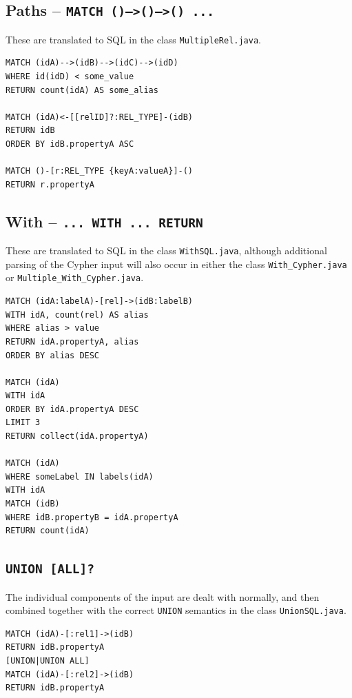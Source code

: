 \documentclass[letterpaper]{ltxdoc}
\begin{document}
\subsection*{Paths -- \texttt{MATCH ()-->()-->() ...}}
These are translated to SQL in the class \texttt{MultipleRel.java}.

\medskip

\begin{lstlisting}[language = Cypher]
MATCH (idA)-->(idB)-->(idC)-->(idD)
WHERE id(idD) < some_value
RETURN count(idA) AS some_alias

MATCH (idA)<-[[relID]?:REL_TYPE]-(idB)
RETURN idB
ORDER BY idB.propertyA ASC

MATCH ()-[r:REL_TYPE {keyA:valueA}]-()
RETURN r.propertyA
\end{lstlisting}

\subsection*{With -- \texttt{... WITH ... RETURN}}
These are translated to SQL in the class \texttt{WithSQL.java}, although additional parsing of the Cypher input will also occur in either the class \texttt{With\_Cypher.java} or \texttt{Multiple\_With\_Cypher.java}.

\medskip

\begin{lstlisting}[language = Cypher]
MATCH (idA:labelA)-[rel]->(idB:labelB)
WITH idA, count(rel) AS alias
WHERE alias > value
RETURN idA.propertyA, alias
ORDER BY alias DESC

MATCH (idA)
WITH idA
ORDER BY idA.propertyA DESC
LIMIT 3
RETURN collect(idA.propertyA)

MATCH (idA)
WHERE someLabel IN labels(idA)
WITH idA
MATCH (idB)
WHERE idB.propertyB = idA.propertyA
RETURN count(idA)
\end{lstlisting}

\newpage

\subsection*{\texttt{UNION [ALL]?}}
The individual components of the input are dealt with normally, and then combined together with the correct \texttt{UNION} semantics in the class \texttt{UnionSQL.java}.

\medskip

\begin{lstlisting}[language = Cypher]
MATCH (idA)-[:rel1]->(idB)
RETURN idB.propertyA
[UNION|UNION ALL]
MATCH (idA)-[:rel2]->(idB)
RETURN idB.propertyA
\end{lstlisting}
\end{document}
